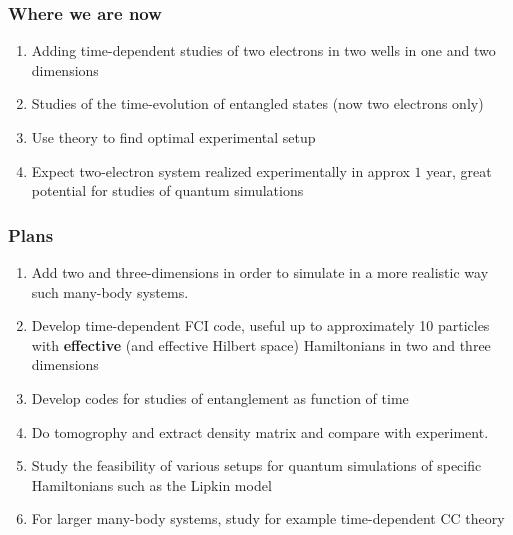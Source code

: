 \documentclass{beamer}
\begin{document}
\begin{frame}
\frametitle{Where we are now}

\begin{enumerate}
\item Adding time-dependent studies of two electrons in two wells in one and two dimensions

\item Studies of the time-evolution of entangled states (now two electrons only)

\item Use theory to find optimal experimental setup

\item Expect two-electron system realized experimentally in approx $1$ year, great potential for studies of quantum simulations
\end{enumerate}

\noindent
\end{frame}

\begin{frame}
\frametitle{Plans}

\begin{enumerate}
\item Add two and three-dimensions in order to simulate in  a more realistic way such many-body systems.

\item Develop time-dependent FCI code, useful up to approximately 10 particles with \textbf{effective} (and effective Hilbert space) Hamiltonians in two and three dimensions

\item Develop codes for studies of entanglement as function of time

\item Do tomogrophy and extract density matrix and compare with experiment.

\item Study the feasibility of various setups for quantum simulations of specific Hamiltonians such as the Lipkin model

\item For larger many-body systems, study for example time-dependent CC theory
\end{enumerate}

\noindent
\end{frame}
\end{document}
